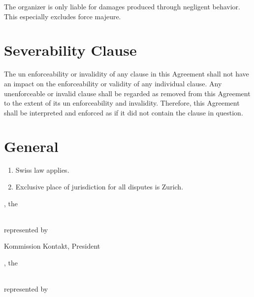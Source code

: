 The organizer is only liable for damages produced through negligent behavior. This especially excludes force majeure.


\section{Severability Clause}

The un enforceability or invalidity of any clause in this Agreement shall not have an
impact on the enforceability or validity of any individual clause. Any unenforceable
or invalid clause shall be regarded as removed from this Agreement to the extent of its
un enforceability and invalidity. Therefore, this Agreement shall be interpreted and
enforced as if it did not contain the clause in question.

\section{General}
\begin{enumerate}
\item Swiss law applies.
\item Exclusive place of jurisdiction for all disputes is Zurich.
\end{enumerate}

\vfill
\noindent
\begin{minipage}[t]{0.45\textwidth}
\amivcity, the \hrulefill

\bigskip\noindent
\amivname\\
represented by

\vspace{4em}
\hrulefill

\amivkontaktpresident

Kommission Kontakt, President
\end{minipage}%
\hspace{0.1\textwidth}
\begin{minipage}[t]{0.45\textwidth}
\makebox[8em]{\hrulefill}, the \hrulefill

\bigskip\noindent
\companyname\\
represented by

\vspace{4em}
\hrulefill

\companycontact\vphantom{Ensure correct height.}\\

\end{minipage}
